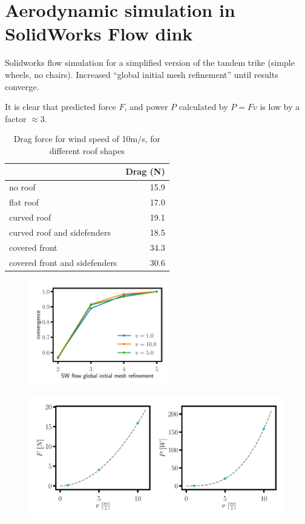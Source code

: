 \documentclass[11pt]{article}
\begin{document}
\section*{Aerodynamic simulation in SolidWorks Flow dink}

Solidworks flow simulation for a simplified version of the tandem trike (simple wheels, no chairs).
Increased ``global initial mesh refinement'' until results converge.

It is clear that predicted force $F$, and power $P$ calculated by $P = F v$ is low by a factor $\approx 3$. 

\begin{table}[h!]
\centering
\begin{tabular}{ | l | r | }
\hline
  & Drag (N) \\ \hline
 no roof & 15.9   \\
 flat roof & 17.0 \\
 curved roof & 19.1 \\
 curved roof and sidefenders & 18.5 \\
 covered front & 34.3 \\
 covered front and sidefenders & 30.6 \\ \hline
\end{tabular}
\caption{Drag force for wind speed of 10m/s, for different roof shapes}
\end{table}

\begin{figure}[h!]
\centering
\includegraphics[width=0.55\textwidth]{convergence.pdf}
\end{figure}

\begin{figure}[h!]
\centering
\includegraphics[width=\textwidth]{ForcePower.pdf}
\end{figure}
\end{document}

